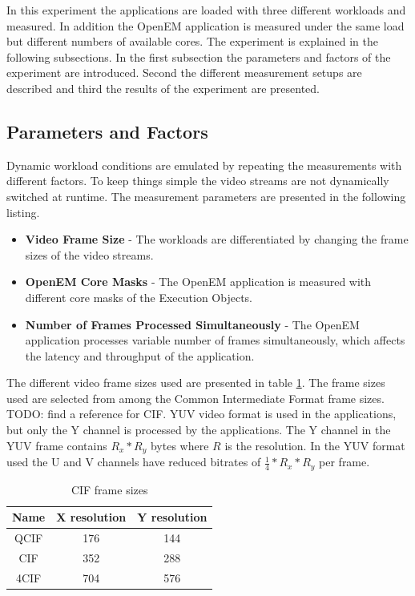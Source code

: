 In this experiment the applications are loaded with three different workloads
and measured. In addition the OpenEM application is measured under the same load
but different numbers of available cores. The experiment is explained in the
following subsections. In the first subsection the parameters and factors of the
experiment are introduced. Second the different measurement setups are described
and third the results of the experiment are presented.

\subsection{Parameters and Factors}
Dynamic workload conditions are emulated by repeating the measurements with
different factors. To keep things simple the video streams are not dynamically
switched at runtime. The measurement parameters are presented in the following
listing.

\begin{itemize}
    \item \textbf{Video Frame Size} - The workloads are differentiated by
        changing the frame sizes of the video streams.
    \item \textbf{OpenEM Core Masks} - The OpenEM application is measured
        with different core masks of the Execution Objects.
    \item \textbf{Number of Frames Processed Simultaneously} - The OpenEM
        application processes variable number of frames simultaneously, which
        affects the latency and throughput of the application.
\end{itemize}

The different video frame sizes used are presented in table
\ref{tab:cif_frames}. The frame sizes used are selected from among the Common
Intermediate Format frame sizes. TODO: find a reference for CIF. YUV video
format is used in the applications, but only the Y channel is processed by the
applications. The Y channel in the YUV frame contains $R_{x} * R_{y}$ bytes
where $R$ is the resolution. In the YUV format used the U and V channels have
reduced bitrates of $\frac{1}{4} * R_{x} * R_{y}$ per frame.

\begin{table}
    \begin{center}
        \begin{tabular}{ c c c }
            Name  & X resolution  & Y resolution \\ \hline
            QCIF  & 176           & 144          \\ \hline
            CIF   & 352           & 288          \\ \hline
            4CIF  & 704           & 576          \\ \hline
        \end{tabular}
        \caption{CIF frame sizes}
        \label{tab:cif_frames}
    \end{center}
\end{table}

